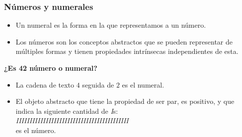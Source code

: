 \documentclass[11pt,a4paper,spanish]{beamer}
\begin{document}
\begin{frame}

\frametitle{Números y numerales}

\begin{itemize}
    \item Un numeral es la forma en la que representamos a un número.
    \item Los números son los conceptos abstractos que se pueden representar
        de múltiples formas y tienen propiedades intrínsecas independientes de
        esta.
\end{itemize}
\pause
\textbf{¿Es 42 número o numeral?}
\pause

\begin{itemize}
    \item La cadena de texto $4$ seguida de $2$ es el numeral.
    \item El objeto abstracto que tiene la propiedad de ser par, es positivo,
        y que indica la siguiente cantidad de \emph{I}s:\\
        \emph{IIIIIIIIIIIIIIIIIIIIIIIIIIIIIIIIIIIIIIIIII}\\
        es el número.
\end{itemize}

\end{frame}
\end{document}
